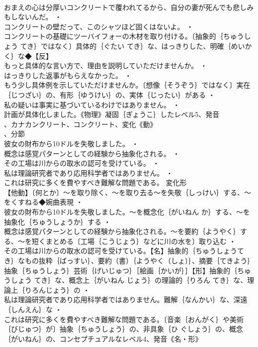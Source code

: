 \documentclass[8pt]{extreport}
\begin{document}
\begin{CJK}{UTF8}{min}
\\	おまえの心は分厚いコンクリートで覆われてるから、自分の妻が死んでも悲しみもしないんだ。 ・
\\	コンクリートの壁だって、このシャツほど固くはないよ。 ・
\\	コンクリートの基礎にツーバイフォーの木材を取り付ける。〔抽象的｛ちゅうしょう てき｝ではなく〕具体的｛ぐたい てき｝な、はっきりした、明確｛めいかく｝な◆【反】
\\	もっと具体的な言い方で、理由を説明していただけませんか。 ・
\\	はっきりした返事がもらえなかった。 ・
\\	もう少し具体例を示していただけませんか。〔想像｛そうぞう｝ではなく〕実在｛じつざい｝の、有形｛ゆうけい｝の、実体｛じったい｝がある ・
\\	私の疑いは事実に基づいているわけではありません。 ・
\\	計画が具体化しました。《物理》凝固｛ぎょうこ｝したレベル5、発音
\\	、カナカンクリート、コンクリート、変化《動》
\\	、分節
\\	彼女の財布から10ドルを失敬しました。 ・
\\	概念は感覚パターンとしての経験から抽象化される。 ・
\\	その工場は川からの取水の認可を受けている。 ・
\\	私は理論研究者であり応用科学者ではありません。 ・
\\	これは研究に多くを費やすべき難解な問題である。	変化形 
\\	【他動】〔何とか〕～を取り除く、～を取り去る～を失敬｛しっけい｝する、～をくすねる◆婉曲表現 ・
\\	彼女の財布から10ドルを失敬しました。～を概念化｛がいねん か｝する、～を抽象化｛ちゅうしょうか｝する ・
\\	概念は感覚パターンとしての経験から抽象化される。～を要約｛ようやく｝する、～を短くまとめる〔工場｛こうじょう｝などに川の水を〕取り込む ・
\\	その工場は川からの取水の認可を受けている。【名】抽象的｛ちゅうしょうてき｝なもの抜粋｛ばっすい｝、要約（書）｛ようやく（しょ）｝、摘要｛てきよう｝抽象｛ちゅうしょう｝芸術｛げいじゅつ｝［絵画｛かいが｝］【形】抽象的｛ちゅうしょう てき｝な、概念上｛がいねん じょう｝の理論的｛りろん てき｝な、理論上｛りろんじょう｝の ・
\\	私は理論研究者であり応用科学者ではありません。難解｛なんかい｝な、深遠｛しんえん｝な ・
\\	これは研究に多くを費やすべき難解な問題である。〔音楽｛おんがく｝や美術｛びじゅつ｝が〕抽象｛ちゅうしょう｝の、非具象｛ひ ぐしょう｝の、概念｛がいねん｝の、コンセプチュアルなレベル4、発音《名・形》

\end{CJK}
\end{document}

